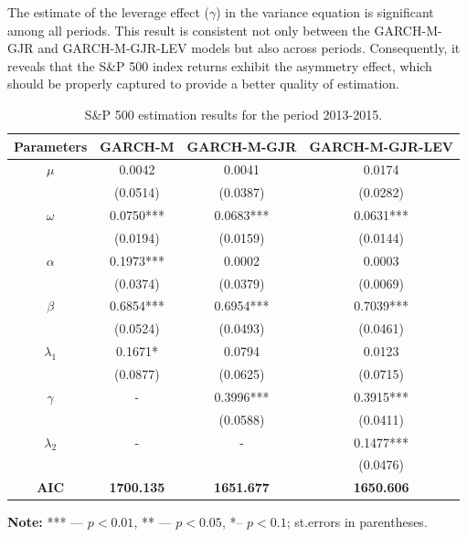 \documentclass[authoryear, 1p]{elsarticle}
\numberwithin{equation}{section}
\begin{document}
The estimate of the leverage effect ($\gamma$) in the variance equation is significant among all periods. This result is consistent not only between the GARCH-M-GJR and GARCH-M-GJR-LEV models but also across periods. Consequently, it reveals that the S\&P 500 index returns exhibit the asymmetry effect, which should be properly captured to provide a better quality of estimation. 

\begin{table}[h!]
\begin{center}
\caption{S\&P 500 estimation results for the period 2013-2015.}
\label{tab:tab_11}
\begin{tabular*}{\textwidth}{cccc}
\hline
\hline
\textbf{Parameters} & \textbf{GARCH-M}  & \textbf{GARCH-M-GJR} & \textbf{GARCH-M-GJR-LEV} \\
\hline
\hline
$\mu$                  & 0.0042            & 0.0041               & 0.0174                   \\
                    & (0.0514)          & (0.0387)             & (0.0282)                 \\
$\omega$               & 0.0750***         & 0.0683***            & 0.0631***                \\
                    & (0.0194)          & (0.0159)             & (0.0144)                 \\
$\alpha$               & 0.1973***         & 0.0002               & 0.0003                   \\
                    & (0.0374)          & (0.0379)             & (0.0069)                 \\
$\beta$                & 0.6854***         & 0.6954***            & 0.7039***                \\
                    & (0.0524)          & (0.0493)             & (0.0461)                 \\
$\lambda_{1}$              & 0.1671*           & 0.0794               & 0.0123                   \\
                    & (0.0877)          & (0.0625)             & (0.0715)                 \\
$\gamma$               & -                 & 0.3996***            & 0.3915***                \\
                    &                   & (0.0588)             & (0.0411)                 \\
$\lambda_{2}$           & -                 & -                    & 0.1477***                \\
                    &                   &                      & (0.0476)                 \\
\hline
\textbf{AIC}        & \textbf{1700.135} & \textbf{1651.677}    & \textbf{1650.606}        \\
\hline
\hline
\end{tabular*}
\end{center}
\footnotesize
\renewcommand{\baselineskip}{11pt}
\textbf{Note:} *** —  $p<0.01$, ** —  $p < 0.05$, *– $p < 0.1$; st.errors in parentheses.
\end{table}
\end{document}
